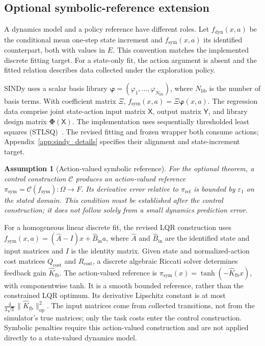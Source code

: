 \documentclass[10pt]{article}
\newtheorem{assumption}[theorem]{Assumption}
\begin{document}
\subsection{Optional symbolic-reference extension}
\label{sec:sindy}

A dynamics model and a policy reference have different roles. Let
$f_{\mathrm{dyn}}(x,a)$ be the conditional mean one-step state increment and
$f_{\mathrm{sym}}(x,a)$ its identified counterpart, both with values in $E$.
This convention matches the implemented discrete fitting target.
For a state-only fit, the action argument is absent and the fitted relation describes data collected under the exploration policy.

SINDy uses a scalar basis library
$\boldsymbol{\varphi}=(\varphi_1,\ldots,\varphi_{N_{\mathrm{lib}}})$,
where $N_{\mathrm{lib}}$ is the number of basis terms. With coefficient matrix $\Xi$,
$f_{\mathrm{sym}}(x,a)=\Xi\boldsymbol{\varphi}(x,a)$.
The regression data comprise joint state-action input matrix $\mathsf X$, output matrix $\mathsf Y$, and library design matrix $\boldsymbol{\Phi}(\mathsf X)$. The implementation uses sequentially thresholded least squares (STLSQ)~\cite{Brunton2016SINDy}. The revised fitting and frozen wrapper both consume actions; Appendix~\ref{app:sindy_details} specifies their alignment and state-increment target.

\begin{assumption}[Action-valued symbolic reference]
\label{assump:sindy}
For the optional theorem, a control construction $\mathcal{C}$ produces an action-valued reference
$\pi_{\mathrm{sym}}=\mathcal{C}(f_{\mathrm{sym}}):\Omega\to F$.
Its derivative error relative to $\pi_{\mathrm{ref}}$ is bounded by $\varepsilon_1$ on the stated domain. This condition must be established after the control construction; it does not follow solely from a small dynamics prediction error.
\end{assumption}

For a homogeneous linear discrete fit, the revised LQR construction uses
$f_{\mathrm{sym}}(x,a)=(\widehat A-I)x+\widehat B_{\mathrm{in}}a$,
where $\widehat A$ and $\widehat B_{\mathrm{in}}$ are the identified state and input matrices and $I$ is the identity matrix.
Given state and normalized-action cost matrices $Q_{\mathrm{cost}}$ and $R_{\mathrm{cost}}$, a discrete algebraic Riccati solver determines feedback gain $\widehat K_{\mathrm{fb}}$.
The action-valued reference is $\pi_{\mathrm{sym}}(x)=\tanh(-\widehat K_{\mathrm{fb}}x)$, with componentwise tanh.
It is a smooth bounded reference, rather than the constrained LQR optimum.
Its derivative Lipschitz constant is at most
$\frac{4}{3\sqrt3}\|\widehat K_{\mathrm{fb}}\|_{\mathrm{op}}^2$.
The input matrices come from collected transitions, not from the simulator's true matrices; only the task costs enter the control construction. Symbolic penalties require this action-valued construction and are not applied directly to a state-valued dynamics model.
\end{document}
